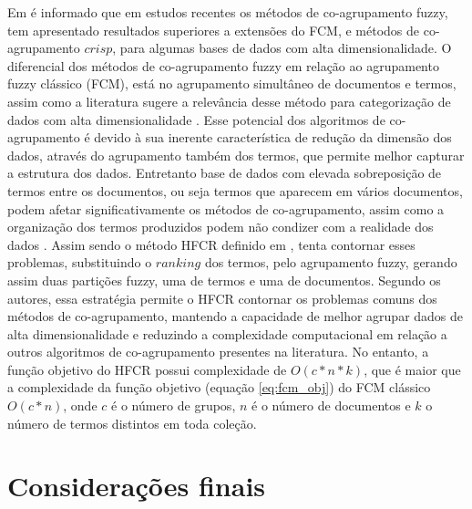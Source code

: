 Em  é informado que em estudos recentes os métodos de co-agrupamento fuzzy,
tem apresentado resultados superiores a extensões do FCM, e métodos de co-agrupamento $crisp$, para
algumas bases de dados com alta dimensionalidade. O diferencial dos métodos de co-agrupamento fuzzy 
em relação ao agrupamento fuzzy clássico (FCM), está no agrupamento simultâneo de documentos e
termos, assim como a literatura sugere a relevância desse método para categorização de dados com
alta dimensionalidade \cite{Yan2013}. Esse potencial dos algoritmos de co-agrupamento é devido 
à sua inerente característica de redução da dimensão dos dados, através do agrupamento também dos
termos, que permite melhor capturar a estrutura dos dados. Entretanto base de dados com elevada
sobreposição de termos entre os documentos, ou seja termos que aparecem em vários documentos, podem
afetar significativamente os métodos de co-agrupamento, assim como a organização dos termos
produzidos podem não condizer com a realidade dos dados \cite{Tjhi2008}. Assim sendo o método HFCR
definido em , tenta contornar esses problemas, substituindo o $ranking$ dos termos,
pelo agrupamento fuzzy, gerando assim duas partições fuzzy, uma de termos e uma de documentos.
Segundo os autores, essa estratégia permite o HFCR contornar os problemas comuns dos métodos de
co-agrupamento, mantendo a capacidade de melhor agrupar dados de alta dimensionalidade e 
reduzindo a complexidade computacional em relação a outros algoritmos de co-agrupamento presentes na
literatura. No entanto, a função objetivo do HFCR possui complexidade de $O(c*n*k)$, que é maior que a
complexidade da função objetivo (equação \ref{eq:fcm_obj}) do FCM clássico $O(c*n)$, onde $c$ é o número de
grupos, $n$ é o número de documentos e $k$ o número de termos distintos em toda coleção.
 
\section{Considerações finais}

